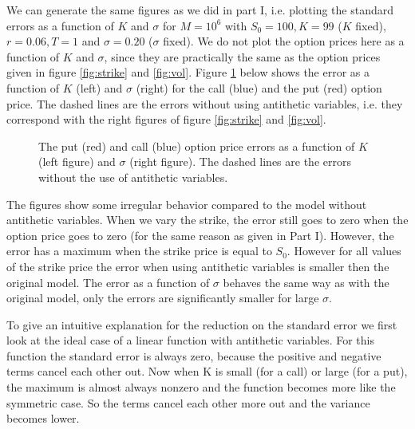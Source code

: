 \documentclass[11pt,a4paper]{article}
\begin{document}
We can generate the same figures as we did in part I, i.e. plotting the standard errors as a function of $K$ and $\sigma$ for $M = 10^6$ with $S_0 = 100, K = 99$ ($K$ fixed), $r = 0.06, T = 1$ and $\sigma = 0.20$ ($\sigma$ fixed). We do not plot the option prices here as a function of $K$ and $\sigma$, since they are practically the same as the option prices given in figure \ref{fig:strike} and \ref{fig:vol}. Figure \ref{fig:anti} below shows the error as a function of $K$ (left) and $\sigma$ (right) for the call (blue) and the put (red) option price. The dashed lines are the errors without using antithetic variables, i.e. they correspond with the right figures of figure \ref{fig:strike} and \ref{fig:vol}.

\begin{figure}[H]
  \centering
  \caption{The put (red) and call (blue) option price errors as a function of $K$ (left figure) and $\sigma$ (right figure). The dashed lines are the errors without the use of antithetic variables.}
  \label{fig:anti}
\end{figure}

The figures show some irregular behavior compared to the model without antithetic variables. When we vary the strike, the error still goes to zero when the option price goes to zero (for the same reason as given in Part I). However, the error has a maximum when the strike price is equal to $S_0$. However for all values of the strike price the error when using antithetic variables is smaller then the original model. The error as a function of $\sigma$ behaves the same way as with the original model, only the errors are significantly smaller for large $\sigma$.

To give an intuitive explanation for the reduction on the standard error we first look at the ideal case of a linear function with antithetic variables. For this function the standard error is always zero, because the positive and negative terms cancel each other out. Now when K is small (for a call) or large (for a put), the maximum is almost always nonzero and the function becomes more like the symmetric case. So the terms cancel each other more out and the variance becomes lower.
\end{document}
